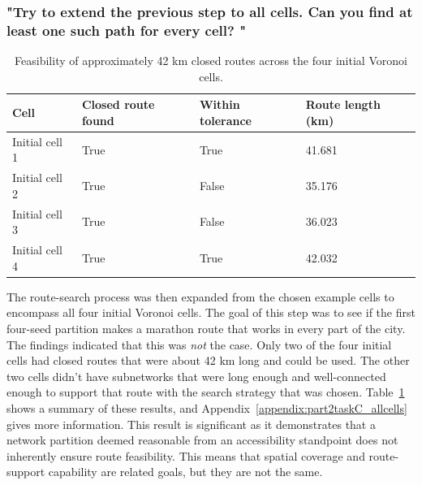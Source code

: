 \documentclass[acmsmall,nonacm,natbib=false]{acmart}
\begin{document}
\subsubsection{\large\textbf{{"Try to extend the previous step to all cells. Can you find at least one such path for every cell? "}}}
\leavevmode \par \noindent
\begin{table}
\centering
\vspace{-10pt}
\caption{Feasibility of approximately 42 km closed routes across the four initial Voronoi cells.}
\label{tab:taskC_feasibility}

\begin{tabular}{p{1.6cm} p{1.15cm} p{1.15cm} p{1.15cm}}
\toprule
\textbf{Cell} & 
\textbf{Closed route found} & 
\textbf{Within tolerance} & 
\textbf{Route length (km)} \\
\midrule
Initial cell 1 & True & True & 41.681 \\
Initial cell 2 & True & False & 35.176 \\
Initial cell 3 & True & False & 36.023 \\
Initial cell 4 & True & True & 42.032 \\
\bottomrule
\end{tabular}

\vspace{-10pt}
\end{table}
The route-search process was then expanded from the chosen example cells to encompass all four initial Voronoi cells. The goal of this step was to see if the first four-seed partition makes a marathon route that works in every part of the city.
The findings indicated that this was \textit{not} the case. Only two of the four initial cells had closed routes that were about 42 km long and could be used. The other two cells didn't have subnetworks that were long enough and well-connected enough to support that route with the search strategy that was chosen. Table~\ref{tab:taskC_feasibility} shows a summary of these results, and Appendix~\ref{appendix:part2taskC_allcells} gives more information.
This result is significant as it demonstrates that a network partition deemed reasonable from an accessibility standpoint does not inherently ensure route feasibility. This means that spatial coverage and route-support capability are related goals, but they are not the same.
\end{document}
